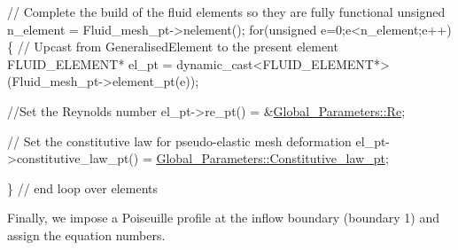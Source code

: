 \begin{DoxyCodeInclude}

 
 \textcolor{comment}{// Complete the build of the fluid elements so they are fully functional}
 \textcolor{keywordtype}{unsigned} n\_element = Fluid\_mesh\_pt->nelement();
 \textcolor{keywordflow}{for}(\textcolor{keywordtype}{unsigned} e=0;e<n\_element;e++)
  \{
   \textcolor{comment}{// Upcast from GeneralisedElement to the present element}
   FLUID\_ELEMENT* el\_pt = 
    \textcolor{keyword}{dynamic\_cast<}FLUID\_ELEMENT*\textcolor{keyword}{>}(Fluid\_mesh\_pt->element\_pt(e));
   
   \textcolor{comment}{//Set the Reynolds number}
   el\_pt->re\_pt() = &\hyperlink{namespaceGlobal__Parameters_a9d72e94a9305c6a310940a6a427ebe06}{Global\_Parameters::Re};
   
   \textcolor{comment}{// Set the constitutive law for pseudo-elastic mesh deformation}
   el\_pt->constitutive\_law\_pt() =
    \hyperlink{namespaceGlobal__Parameters_adbd1f040f375c96fe56b3f475f7dbec2}{Global\_Parameters::Constitutive\_law\_pt};
   
  \} \textcolor{comment}{// end loop over elements}

\end{DoxyCodeInclude}


Finally, we impose a Poiseuille profile at the inflow boundary (boundary 1) and assign the equation numbers.


